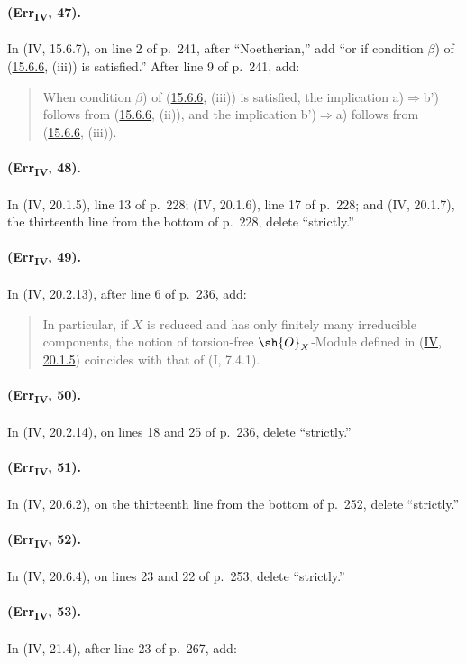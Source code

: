 {\paragraph{(Err\textsubscript{IV}, 47).}
In (IV, 15.6.7), on line 2 of p.~241, after ``Noetherian,'' add ``or if
condition $\beta$) of ({\hyperlink{ega4.c04.prop.15-6-6}{15.6.6}}, (iii)) is satisfied.''  After line 9 of
p.~241, add:
\begin{quote}
When condition $\beta$) of ({\hyperlink{ega4.c04.prop.15-6-6}{15.6.6}}, (iii)) is satisfied, the implication
a)$\Rightarrow$b') follows from ({\hyperlink{ega4.c04.prop.15-6-6}{15.6.6}}, (ii)), and the implication
b')$\Rightarrow$a) follows from ({\hyperlink{ega4.c04.prop.15-6-6}{15.6.6}}, (iii)).
\end{quote}

\paragraph{(Err\textsubscript{IV}, 48).}
In (IV, 20.1.5), line 13 of p.~228; (IV, 20.1.6), line 17 of p.~228;
and (IV, 20.1.7), the thirteenth line from the bottom of p.~228, delete
``strictly.''

\paragraph{(Err\textsubscript{IV}, 49).}
In (IV, 20.2.13), after line 6 of p.~236, add:
\begin{quote}
In particular, if $X$ is reduced and has only finitely many irreducible
components, the notion of torsion-free $\sh{O}_X$-Module defined in
({\hyperlink{ega4.c04.statement.20-1-5}{IV, 20.1.5}}) coincides with that of (I, 7.4.1).
\end{quote}

\paragraph{(Err\textsubscript{IV}, 50).}
In (IV, 20.2.14), on lines 18 and 25 of p.~236, delete ``strictly.''

\paragraph{(Err\textsubscript{IV}, 51).}
In (IV, 20.6.2), on the thirteenth line from the bottom of p.~252,
delete ``strictly.''

\paragraph{(Err\textsubscript{IV}, 52).}
In (IV, 20.6.4), on lines 23 and 22 of p.~253, delete ``strictly.''

\paragraph{(Err\textsubscript{IV}, 53).}
In (IV, 21.4), after line 23 of p.~267, add:

\def\EGAIVSuppressErratumLabels{1}

\let\EGAIVSuppressErratumLabels\undefined
}

